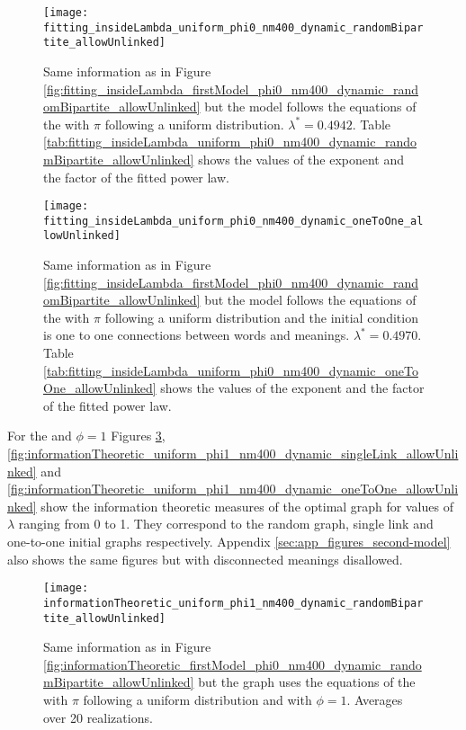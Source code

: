 \begin{figure}
  \centering
  \texttt{[image: fitting\_insideLambda\_uniform\_phi0\_nm400\_dynamic\_randomBipartite\_allowUnlinked]}
  \caption{Same information as in Figure \ref{fig:fitting_insideLambda_firstModel_phi0_nm400_dynamic_randomBipartite_allowUnlinked} but the model follows the equations of the \secondmodel{} with $\pi$ following a uniform distribution. $\lambda^*=0.4942$.
Table \ref{tab:fitting_insideLambda_uniform_phi0_nm400_dynamic_randomBipartite_allowUnlinked} shows the values of the exponent and the factor of the fitted power law.}
  \label{fig:fitting_insideLambda_uniform_phi0_nm400_dynamic_randomBipartite_allowUnlinked}
\end{figure}

\begin{figure}
  \centering
  \texttt{[image: fitting\_insideLambda\_uniform\_phi0\_nm400\_dynamic\_oneToOne\_allowUnlinked]}
  \caption{Same information as in Figure \ref{fig:fitting_insideLambda_firstModel_phi0_nm400_dynamic_randomBipartite_allowUnlinked} but the model follows the equations of the \secondmodel{} with $\pi$ following a uniform distribution and the initial condition is one to one connections between words and meanings. $\lambda^*=0.4970$.
Table \ref{tab:fitting_insideLambda_uniform_phi0_nm400_dynamic_oneToOne_allowUnlinked} shows the values of the exponent and the factor of the fitted power law.}
  \label{fig:fitting_insideLambda_uniform_phi0_nm400_dynamic_oneToOne_allowUnlinked}
\end{figure}





For the \secondmodel{} and $\phi=1$ Figures \ref{fig:informationTheoretic_uniform_phi1_nm400_dynamic_randomBipartite_allowUnlinked},  \ref{fig:informationTheoretic_uniform_phi1_nm400_dynamic_singleLink_allowUnlinked} and \ref{fig:informationTheoretic_uniform_phi1_nm400_dynamic_oneToOne_allowUnlinked} show the information theoretic measures of the optimal graph for values of $\lambda$ ranging from 0 to 1.
They correspond to the random graph, single link and one-to-one initial graphs respectively.
Appendix \ref{sec:app_figures_second-model} also shows the same figures but with disconnected meanings disallowed.

\begin{figure}
  \centering
  \texttt{[image: informationTheoretic\_uniform\_phi1\_nm400\_dynamic\_randomBipartite\_allowUnlinked]}
  \caption{Same information as in Figure \ref{fig:informationTheoretic_firstModel_phi0_nm400_dynamic_randomBipartite_allowUnlinked} but the graph uses the equations of the \secondmodel{} with $\pi$ following a uniform distribution and with $\phi=1$. Averages over 20 realizations.}
  \label{fig:informationTheoretic_uniform_phi1_nm400_dynamic_randomBipartite_allowUnlinked}
\end{figure}

